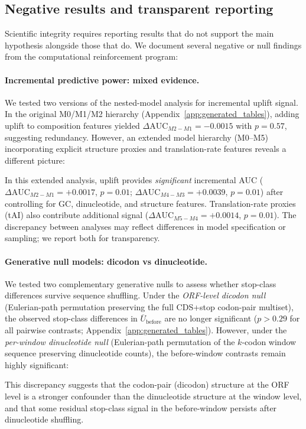 \subsection{Negative results and transparent reporting}
\label{sec:negative_results}

Scientific integrity requires reporting results that do not support the main hypothesis alongside those that do.
We document several negative or null findings from the computational reinforcement program:

\paragraph{Incremental predictive power: mixed evidence.}
We tested two versions of the nested-model analysis for incremental uplift signal.
In the original M0/M1/M2 hierarchy (Appendix~\ref{app:generated_tables}), adding uplift to composition features yielded $\Delta\mathrm{AUC}_{M2-M1}=-0.0015$ with $p=0.57$, suggesting redundancy.
However, an extended model hierarchy (M0--M5) incorporating explicit structure proxies and translation-rate features reveals a different picture:

In this extended analysis, uplift provides \emph{significant} incremental AUC ($\Delta\mathrm{AUC}_{M2-M1}=+0.0017$, $p=0.01$; $\Delta\mathrm{AUC}_{M4-M3}=+0.0039$, $p=0.01$) after controlling for GC, dinucleotide, and structure features.
Translation-rate proxies (tAI) also contribute additional signal ($\Delta\mathrm{AUC}_{M5-M4}=+0.0014$, $p=0.01$).
The discrepancy between analyses may reflect differences in model specification or sampling; we report both for transparency.

\paragraph{Generative null models: dicodon vs dinucleotide.}
\label{sec:null_models}
We tested two complementary generative nulls to assess whether stop-class differences survive sequence shuffling.
Under the \emph{ORF-level dicodon null} (Eulerian-path permutation preserving the full CDS+stop codon-pair multiset), the observed stop-class differences in $\overline{U}_{\mathrm{before}}$ are no longer significant ($p>0.29$ for all pairwise contrasts; Appendix~\ref{app:generated_tables}).
However, under the \emph{per-window dinucleotide null} (Eulerian-path permutation of the $k$-codon window sequence preserving dinucleotide counts), the before-window contrasts remain highly significant:

This discrepancy suggests that the codon-pair (dicodon) structure at the ORF level is a stronger confounder than the dinucleotide structure at the window level, and that some residual stop-class signal in the before-window persists after dinucleotide shuffling.

